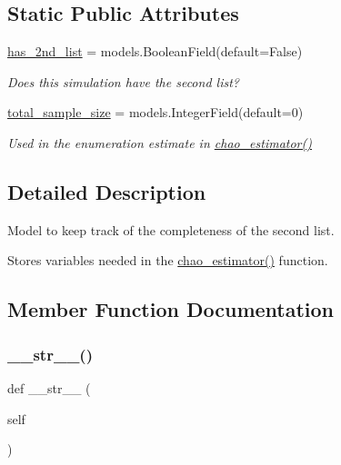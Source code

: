 \subsection*{Static Public Attributes}
\begin{DoxyCompactItemize}
\item 
\mbox{\hyperlink{classjoinapp_1_1models_1_1estimator_1_1_estimator_abee8b19cb56f38f5834e09e82ec9757b}{has\+\_\+2nd\+\_\+list}} = models.\+Boolean\+Field(default=False)
\begin{DoxyCompactList}\small\item\em Does this simulation have the second list? \end{DoxyCompactList}\item 
\mbox{\hyperlink{classjoinapp_1_1models_1_1estimator_1_1_estimator_a76d6a2f259d803ee6a381876fbb054d6}{total\+\_\+sample\+\_\+size}} = models.\+Integer\+Field(default=0)
\begin{DoxyCompactList}\small\item\em Used in the enumeration estimate in \mbox{\hyperlink{classjoinapp_1_1models_1_1estimator_1_1_estimator_a582efaf16c8455e890ef61101a863966}{chao\+\_\+estimator()}} \end{DoxyCompactList}\end{DoxyCompactItemize}


\subsection{Detailed Description}
Model to keep track of the completeness of the second list. 

Stores variables needed in the \mbox{\hyperlink{classjoinapp_1_1models_1_1estimator_1_1_estimator_a582efaf16c8455e890ef61101a863966}{chao\+\_\+estimator()}} function. 

\subsection{Member Function Documentation}
\mbox{\label{classjoinapp_1_1models_1_1estimator_1_1_estimator_a23e8041ce1015febe4fdace3225714f9}} 
\subsubsection{\texorpdfstring{\_\_str\_\_()}{\_\_str\_\_()}}
{\footnotesize\ttfamily def \+\_\+\+\_\+str\+\_\+\+\_\+ (\begin{DoxyParamCaption}\item[{}]{self }\end{DoxyParamCaption})}

